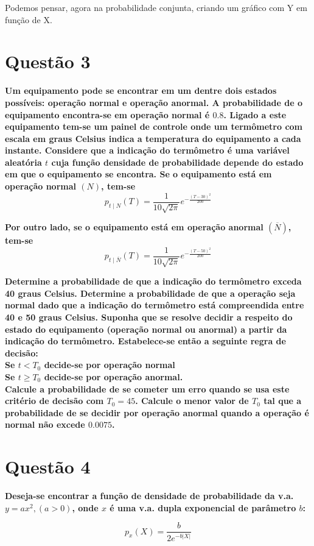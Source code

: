 \documentclass[a5paper]{report}
\begin{document}
Podemos pensar, agora na probabilidade conjunta, criando um gráfico com Y em função de X.


\section*{Questão 3}

\textbf{Um equipamento pode se encontrar em um dentre dois estados\\ possíveis: operação normal e operação anormal.
A probabilidade de o equipamento encontra-se em operação normal é $0.8$. Ligado a este equipamento tem-se um painel de controle onde um termômetro com escala em graus Celsius indica a temperatura do equipamento a cada instante. Considere que a indicação do termômetro é uma variável aleatória $t$ cuja função densidade de probabilidade depende do estado em que o equipamento se encontra. Se o equipamento está em operação normal $(N)$, tem-se}
\[p_{t \mid N}(T) = \frac{1}{10\sqrt{2\pi}} e^{-\frac{(T - 30)^2}{200}}\]

\textbf{Por outro lado, se o equipamento está em operação anormal $(\overline{N})$, tem-se}
\[p_{t \mid \overline{N}}(T) = \frac{1}{10\sqrt{2\pi}} e^{-\frac{(T - 50)^2}{200}}\]

\textbf{Determine a probabilidade de que a indicação do termômetro exceda 40 graus Celsius.
Determine a probabilidade de que a operação seja normal dado que a indicação do
termômetro está compreendida entre 40 e 50 graus Celsius. 
Suponha que se resolve decidir a respeito do estado do equipamento (operação normal ou anormal) a partir da
indicação do termômetro. Estabelece-se então a seguinte regra de decisão:\\
Se $t < T_0$ decide-se por operação normal\\
Se $t \geq T_0$ decide-se por operação anormal.\\
Calcule a probabilidade de se cometer um erro quando se usa este critério de decisão com
$T_0 = 45$. Calcule o menor valor de $T_0$ tal que a probabilidade de se decidir por operação
anormal quando a operação é normal não excede $0.0075$.}

\section*{Questão 4}
\textbf{Deseja-se encontrar a função de densidade de probabilidade da v.a. $y = ax^2, (a > 0)$, onde $x$ é uma v.a. dupla exponencial de parâmetro $b$:}

\[p_x(X) = \frac{b}{2e^{-b|X|}}\]
\end{document}
